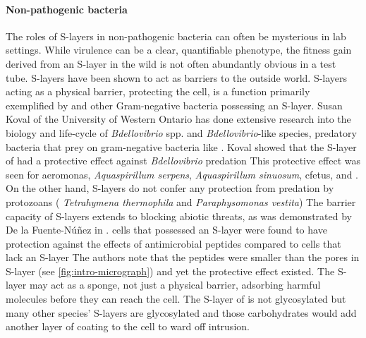 \paragraph{Non-pathogenic bacteria} \label{sec:non-path-bact} %
The roles of \acp{S-layer} in non-pathogenic bacteria can often be mysterious in lab settings. While virulence can be a clear, quantifiable phenotype, the fitness gain derived from an \ac{S-layer} in the wild is not often abundantly obvious in a test tube. \acp{S-layer} have been shown to act as barriers to the outside world.
\acp{S-layer} acting as a physical barrier, protecting the cell, is a function primarily exemplified by \caulobacter and other Gram-negative bacteria possessing an \ac{S-layer}. Susan Koval of the University of Western Ontario has done extensive research into the biology and life-cycle of \textit{Bdellovibrio} spp. and \textit{Bdellovibrio}-like species, predatory bacteria that prey on gram-negative bacteria like \caulobacter. Koval showed that the \ac{S-layer} of \caulobacter had a protective effect against \textit{Bdellovibrio} predation This protective effect was seen for  \ac{aeromonas}, \textit{Aquaspirillum serpens}, \textit{Aquaspirillum sinuosum}, \ac{cfetus}, and \caulobacter. On the other hand, \acp{S-layer} do not confer any protection from predation by protozoans (\eg{} \textit{Tetrahymena thermophila} and \textit{Paraphysomonas vestita}) The barrier capacity of \acp{S-layer} extends to blocking abiotic threats, as was demonstrated by De la Fuente-N{\'u}{\~n}ez \etal in . \caulobacter cells that possessed an \ac{S-layer} were found to have protection against the effects of antimicrobial peptides compared to cells that lack an \ac{S-layer} The authors note that the peptides were smaller than the pores in \caulobacter \ac{S-layer} (see \cref{fig:intro-micrograph}) and yet the protective effect existed. The \ac{S-layer} may act as a sponge, not just a physical barrier, adsorbing harmful molecules before they can reach the cell. The \ac{S-layer} of \caulobacter{} is not glycosylated but many other species' \acp{S-layer} are glycosylated and those carbohydrates would add another layer of coating to the cell to ward off intrusion.


